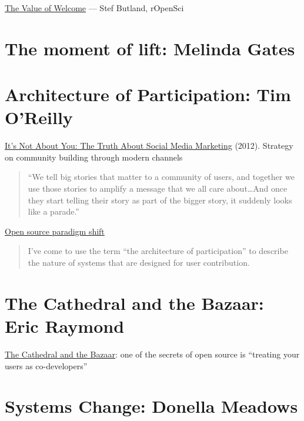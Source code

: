 \documentclass[
  letterpaper,
  DIV=11,
  numbers=noendperiod]{scrreprt}
\begin{document}
\href{https://ropensci.org/blog/2017/07/18/value-of-welcome/}{The Value
of Welcome} --- Stef Butland, rOpenSci

\hypertarget{the-moment-of-lift-melinda-gates}{%
\section{The moment of lift: Melinda
Gates}\label{the-moment-of-lift-melinda-gates}}

\hypertarget{architecture-of-participation-tim-oreilly}{%
\section{Architecture of Participation: Tim
O'Reilly}\label{architecture-of-participation-tim-oreilly}}

\href{https://www.linkedin.com/pulse/20121002122119-16553-it-s-not-about-you-the-truth-about-social-media-marketing}{It's
Not About You: The Truth About Social Media Marketing} (2012). Strategy
on community building through modern channels

\begin{quote}
``We tell big stories that matter to a community of users, and together
we use those stories to amplify a message that we all care
about\ldots And once they start telling their story as part of the
bigger story, it suddenly looks like a parade.''
\end{quote}

\href{https://www.oreilly.com/pub/a/tim/articles/paradigmshift_0504.html}{Open
source paradigm shift}

\begin{quote}
I've come to use the term ``the architecture of participation'' to
describe the nature of systems that are designed for user contribution.
\end{quote}

\hypertarget{the-cathedral-and-the-bazaar-eric-raymond}{%
\section{The Cathedral and the Bazaar: Eric
Raymond}\label{the-cathedral-and-the-bazaar-eric-raymond}}

\href{https://www.oreilly.com/library/view/the-cathedral/0596001088/ch02.html\#catbmain}{The
Cathedral and the Bazaar}: one of the secrets of open source is
``treating your users as co-developers''

\hypertarget{systems-change-donella-meadows}{%
\section{Systems Change: Donella
Meadows}\label{systems-change-donella-meadows}}
\end{document}
